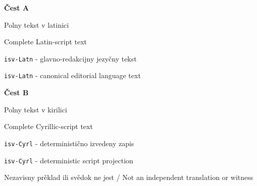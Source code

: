\documentclass[11pt]{article}
\begin{document}
\label{part:latn}
\thispagestyle{empty}
\begin{center}
\vspace*{5cm}
{\sffamily\color{NoetherBlue}\Huge\bfseries Čest A\par}
\vspace{0.6cm}
{\sffamily\LARGE Polny tekst v latinici\par}
{\sffamily\Large Complete Latin-script text\par}
\vfill
{\large \texttt{isv-Latn} - glavno-redakcijny jezyčny tekst\par}
{\large \texttt{isv-Latn} - canonical editorial language text\par}
\end{center}
\clearpage


\label{part:cyrl}
\thispagestyle{empty}
\begin{center}
\vspace*{5cm}
{\sffamily\color{NoetherBlue}\Huge\bfseries Čest B\par}
\vspace{0.6cm}
{\sffamily\LARGE Polny tekst v kirilici\par}
{\sffamily\Large Complete Cyrillic-script text\par}
\vfill
{\large \texttt{isv-Cyrl} - deterministično izvedeny zapis\par}
{\large \texttt{isv-Cyrl} - deterministic script projection\par}
{\small Nezavisny prěklad ili svědok ne jest / Not an independent translation or witness\par}
\end{center}
\clearpage

\end{document}
